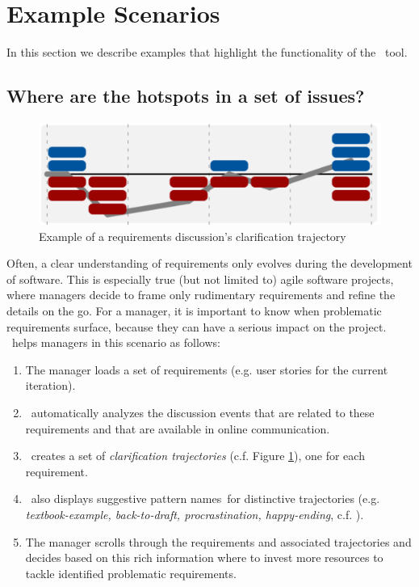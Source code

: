 \section{Example Scenarios}
In this section we describe examples that highlight the functionality of the \viss\ tool.

\subsection{Where are the hotspots in a set of issues?}
\begin{figure}[b]
\includegraphics[width=\columnwidth]{img/example-trajectory}
\caption{Example of a requirements discussion's clarification trajectory}
\label{fig:example-trajectory}
\end{figure}
Often, a clear understanding of requirements only evolves during the development of software.
This is especially true (but not limited to) agile software projects, where managers decide to frame only rudimentary requirements and refine the details on the go.
For a manager, it is important to know when problematic requirements surface, because they can have a serious impact on the project.
\viss\ helps managers in this scenario as follows:
\begin{enumerate}
\item The manager loads a set of requirements (e.g. user stories for the current iteration).
\item \viss\ automatically analyzes the discussion events that are related to these requirements and that are available in online communication.  
\item \viss\ creates a set of \emph{clarification trajectories} (c.f. Figure \ref{fig:example-trajectory}), one for each requirement. 
\item \viss\ also displays suggestive pattern names\ for distinctive trajectories (e.g. \emph{textbook-example, back-to-draft, procrastination, happy-ending}, c.f. \cite{Knauss2012f}).
\item The manager scrolls through the requirements and associated trajectories and decides based on this rich information where to invest more resources to tackle identified problematic requirements.
\end{enumerate}
